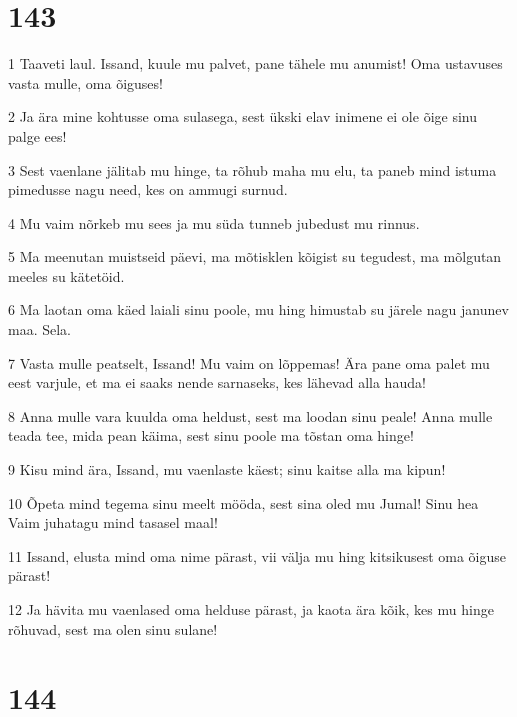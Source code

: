 \chapter{143}

\par 1 Taaveti laul. Issand, kuule mu palvet, pane tähele mu anumist! Oma ustavuses vasta mulle, oma õiguses!
\par 2 Ja ära mine kohtusse oma sulasega, sest ükski elav inimene ei ole õige sinu palge ees!
\par 3 Sest vaenlane jälitab mu hinge, ta rõhub maha mu elu, ta paneb mind istuma pimedusse nagu need, kes on ammugi surnud.
\par 4 Mu vaim nõrkeb mu sees ja mu süda tunneb jubedust mu rinnus.
\par 5 Ma meenutan muistseid päevi, ma mõtisklen kõigist su tegudest, ma mõlgutan meeles su kätetöid.
\par 6 Ma laotan oma käed laiali sinu poole, mu hing himustab su järele nagu janunev maa. Sela.
\par 7 Vasta mulle peatselt, Issand! Mu vaim on lõppemas! Ära pane oma palet mu eest varjule, et ma ei saaks nende sarnaseks, kes lähevad alla hauda!
\par 8 Anna mulle vara kuulda oma heldust, sest ma loodan sinu peale! Anna mulle teada tee, mida pean käima, sest sinu poole ma tõstan oma hinge!
\par 9 Kisu mind ära, Issand, mu vaenlaste käest; sinu kaitse alla ma kipun!
\par 10 Õpeta mind tegema sinu meelt mööda, sest sina oled mu Jumal! Sinu hea Vaim juhatagu mind tasasel maal!
\par 11 Issand, elusta mind oma nime pärast, vii välja mu hing kitsikusest oma õiguse pärast!
\par 12 Ja hävita mu vaenlased oma helduse pärast, ja kaota ära kõik, kes mu hinge rõhuvad, sest ma olen sinu sulane!

\chapter{144}

